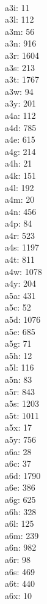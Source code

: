 \begin{multicols}{8}
  \\a3i: 11
  \\a3l: 112
  \\a3m: 56
  \\a3n: 916
  \\a3r: 1604
  \\a3s: 213
  \\a3t: 1767
  \\a3w: 94
  \\a3y: 201
  \\a4a: 112
  \\a4d: 785
  \\a4e: 615
  \\a4g: 214
  \\a4h: 21
  \\a4k: 151
  \\a4l: 192
  \\a4m: 20
  \\a4n: 456
  \\a4p: 84
  \\a4r: 523
  \\a4s: 1197
  \\a4t: 811
  \\a4w: 1078
  \\a4y: 204
  \\a5a: 431
  \\a5c: 52
  \\a5d: 1076
  \\a5e: 685
  \\a5g: 71
  \\a5h: 12
  \\a5l: 116
  \\a5n: 83
  \\a5r: 843
  \\a5s: 1203
  \\a5t: 1011
  \\a5x: 17
  \\a5y: 756
  \\a6a: 28
  \\a6c: 37
  \\a6d: 1790
  \\a6e: 386
  \\a6g: 625
  \\a6h: 328
  \\a6l: 125
  \\a6m: 239
  \\a6n: 982
  \\a6r: 98
  \\a6s: 469
  \\a6t: 440
  \\a6x: 10

\end{multicols}
